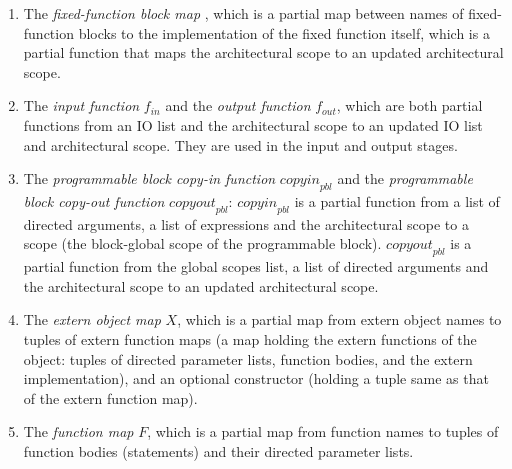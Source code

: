 \documentclass[UTF8]{article}
\begin{document}
\begin{enumerate}
\item The \emph{fixed-function block map} \ffbm{}, which is a partial map between names of fixed-function blocks to the implementation of the fixed function itself, which is a partial function that maps the architectural scope to an updated architectural scope.
\item The \emph{input function} $f_{ \mathit{in} }$ and the \emph{output function} $f_{ \mathit{out} }$, which are both partial functions from an IO list and the architectural scope to an updated IO list and architectural scope. They are used in the input and output stages.
\item The \emph{programmable block copy-in function} $\mathit{copyin}_{ \mathit{pbl} }$ and the \emph{programmable block copy-out function} $\mathit{copyout}_{ \mathit{pbl} }$: $\mathit{copyin}_{ \mathit{pbl} }$ is a partial function from a list of directed arguments, a list of expressions and the architectural scope to a scope (the block-global scope of the programmable block). $\mathit{copyout}_{ \mathit{pbl} }$ is a partial function from the global scopes list, a list of directed arguments and the architectural scope to an updated architectural scope.
\item The \emph{extern object map} $X$, which is a partial map from extern object names to tuples of extern function maps (a map holding the extern functions of the object: tuples of directed parameter lists, function bodies, and the extern implementation), and an optional constructor (holding a tuple same as that of the extern function map).
\item The \emph{function map} $F$, which is a partial map from function names to tuples of function bodies (statements) and their directed parameter lists.
\end{enumerate}
\end{document}
